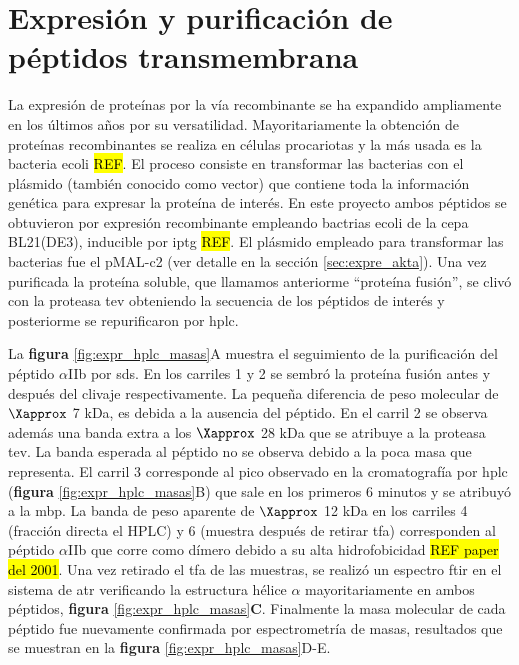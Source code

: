 \section{Expresión y purificación de péptidos transmembrana}

La expresión de proteínas por la vía recombinante se ha expandido ampliamente en los últimos años por su versatilidad. Mayoritariamente la obtención de proteínas recombinantes se realiza en células procariotas y la más usada es la bacteria \ac{ecoli} \hl{REF}. El proceso consiste en transformar las bacterias con el plásmido (también conocido como vector) que contiene toda la información genética para expresar la proteína de interés. En este proyecto ambos péptidos se obtuvieron por expresión recombinante empleando bactrias \ac{ecoli} de la cepa BL21(DE3), inducible por \ac{iptg} \hl{REF}. El plásmido empleado para transformar las bacterias fue el pMAL-c2 (ver detalle en la sección \ref{sec:expre_akta}).
Una vez purificada la proteína soluble, que llamamos anteriorme ``proteína fusión'', se clivó con la proteasa \ac{tev} obteniendo la secuencia de los péptidos de interés y posteriorme se repurificaron por \ac{hplc}. 


La \textbf{figura} \ref{fig:expr_hplc_masas}A muestra el seguimiento de la purificación del péptido $\alpha$IIb por \ac{sds}. En los  carriles 1 y 2 se sembró la proteína fusión antes y después del clivaje respectivamente. La pequeña diferencia de peso molecular de $\Xapprox$ 7 kDa, es debida a la ausencia del péptido. En el carril 2 se observa además una banda extra a los $\Xapprox$ 28 kDa que se atribuye a la proteasa \ac{tev}. La banda esperada al péptido no se observa debido a la poca masa que representa. El carril 3 corresponde al pico observado en la cromatografía por \ac{hplc} (\textbf{figura} \ref{fig:expr_hplc_masas}B) que sale en los primeros 6 minutos y se atribuyó a la \ac{mbp}. La banda de peso aparente de $\Xapprox$ 12 kDa en los carriles 4 (fracción directa el HPLC) y 6 (muestra después de retirar \ac{tfa}) corresponden al péptido $\alpha$IIb que corre como dímero debido a su alta hidrofobicidad \hl{REF paper del 2001}. Una vez retirado el \ac{tfa} de las muestras, se realizó un espectro \ac{ftir} en el sistema de \ac{atr} verificando la estructura hélice $\alpha$ mayoritariamente en ambos péptidos, \textbf{figura} \ref{fig:expr_hplc_masas}\textbf{C}. Finalmente la masa molecular de cada péptido fue nuevamente confirmada por espectrometría de masas, resultados que se muestran en la \textbf{figura} \ref{fig:expr_hplc_masas}D-E.

